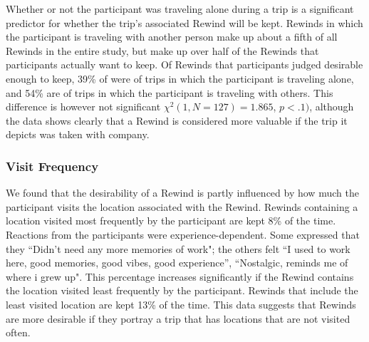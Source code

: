 \documentclass{sigchi}
\begin{document}
Whether or not the participant was traveling alone during a trip is a significant predictor for whether the trip's associated Rewind will be kept. Rewinds in which the participant is traveling with another person make up about a fifth of all Rewinds in the entire study, but make up over half of the Rewinds that participants actually want to keep. Of Rewinds that participants judged desirable enough to keep, 39\% of were of trips in which the participant is traveling alone, and 54\% are of trips in which the participant is traveling with others. This difference is however not significant $\chi^2(1, N=127) = 1.865$, $p <.1)$, although the data shows clearly that a Rewind is considered more valuable if the trip it depicts was taken with company. 


\subsubsection{Visit Frequency}
We found that the desirability of a Rewind is partly influenced by how much the participant visits the location associated with the Rewind. Rewinds containing a location visited most frequently by the participant are kept 8\% of the time. Reactions from the participants were experience-dependent.
Some expressed that they ``Didn't need any more memories of work"; the others felt ``I used to work here, good memories, good vibes, good experience'', ``Nostalgic, reminds me of where i grew up". This percentage increases significantly if the Rewind contains the location visited least frequently by the participant. Rewinds that include the least visited location are kept 13\% of the time. This data suggests that Rewinds are more desirable if they portray a trip that has locations that are not visited often.
\end{document}
